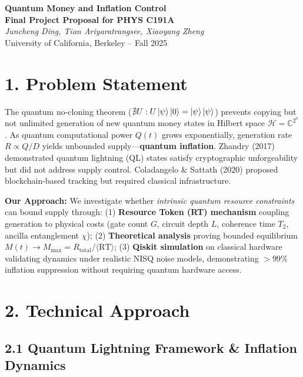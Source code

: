 \documentclass[a4paper,11pt,twoside]{article}
\begin{document}
\begin{center}
{\Large \textbf{Quantum Money and Inflation Control}} \\[4pt]
\textbf{Final Project Proposal for PHYS C191A}\\[2pt]
\textit{Juncheng Ding, Tian Ariyaratrangsee, Xiaoyang Zheng}\\[2pt]
University of California, Berkeley – Fall 2025
\end{center}

\vspace{-8pt}
\section*{1. Problem Statement}
\vspace{-4pt}

The quantum no-cloning theorem ($\nexists U: U\ket{\psi}\ket{0} = \ket{\psi}\ket{\psi}$) prevents copying but not unlimited generation of new quantum money states in Hilbert space $\mathcal{H} = \mathbb{C}^{2^n}$. As quantum computational power $Q(t)$ grows exponentially, generation rate $R \propto Q/D$ yields unbounded supply—\textbf{quantum inflation}. Zhandry (2017) demonstrated quantum lightning (QL) states satisfy cryptographic unforgeability but did not address supply control. Coladangelo \& Sattath (2020) proposed blockchain-based tracking but required classical infrastructure.

\textbf{Our Approach:} We investigate whether \textit{intrinsic quantum resource constraints} can bound supply through: (1) \textbf{Resource Token (RT) mechanism} coupling generation to physical costs (gate count $G$, circuit depth $L$, coherence time $T_2$, ancilla entanglement $\chi$); (2) \textbf{Theoretical analysis} proving bounded equilibrium $M(t) \to M_{\max} = R_{\text{total}}/\langle\text{RT}\rangle$; (3) \textbf{Qiskit simulation} on classical hardware validating dynamics under realistic NISQ noise models, demonstrating $>99\%$ inflation suppression without requiring quantum hardware access.

\vspace{-4pt}
\section*{2. Technical Approach}
\vspace{-6pt}

\subsection*{2.1 Quantum Lightning Framework \& Inflation Dynamics}
\vspace{-4pt}
\end{document}
